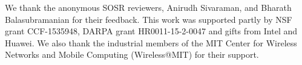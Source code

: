 \documentclass[10pt,twocolumn,sigconf]{acmart}
\newif \ifappendix \appendixfalse
\renewcommand{\-}{\ensuremath{\vdash}}
\renewcommand{\=}{\ensuremath{\models}}
\begin{document}
%


\begin{acks}
  We thank the anonymous SOSR reviewers, Anirudh Sivaraman, and Bharath
  Balasubramanian for their feedback.  This
  work was supported partly by NSF grant CCF-1535948, DARPA grant
  HR0011-15-2-0047 and gifts from
  Intel and Huawei. We also thank the industrial members of the MIT Center for
  Wireless Networks and Mobile Computing (Wireless@MIT) for their support.

\end{acks}


\clearpage
\setlength{\parskip}{-1pt}
\setlength{\itemsep}{-1pt}
 \footnotesize %


\begin{small}

\end{small}

{%
}

\ifappendix
\clearpage
\appendix

\fi
\end{document}
